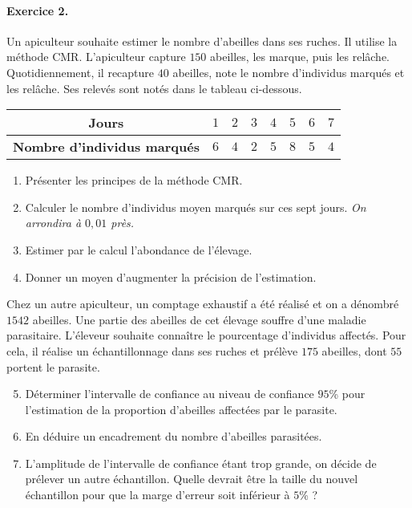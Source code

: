 \documentclass[11pt]{article}
\begin{document}
\paragraph{Exercice 2.} Un apiculteur souhaite estimer le nombre d'abeilles dans
ses ruches. Il utilise la méthode CMR. L'apiculteur capture $150$ abeilles, les
marque, puis les rel\^ache. Quotidiennement, il recapture $40$ abeilles, note le
nombre d'individus marqués et les rel\^ache. Ses relevés sont notés dans le
tableau ci-dessous.
\begin{center}
  \renewcommand{\arraystretch}{1.2}
  \begin{tabular}[]{|c|c|c|c|c|c|c|c|}
    \hline
    \textbf{Jours} & $1$ & $2$ & $3$ & $4$ & $5$ & $6$ & $7$ \\
    \hline
    \textbf{Nombre d'individus marqués} & $6$ & $4$ & $2$ & $5$ & $8$ & $5$ &
    $4$ \\
    \hline
  \end{tabular}
\end{center}
\begin{enumerate}
  \item Présenter les principes de la méthode CMR.
  \item Calculer le nombre d'individus moyen marqués sur ces sept jours.
    \emph{On arrondira à $0,01$ près.}
  \item Estimer par le calcul l'abondance de l'élevage.
  \item Donner un moyen d'augmenter la précision de l'estimation.
\end{enumerate}
Chez un autre apiculteur, un comptage exhaustif a été réalisé et on a dénombré
$1542$ abeilles. Une partie des abeilles de cet élevage souffre d'une maladie
parasitaire. L'éleveur souhaite connaître le pourcentage d'individus affectés.
Pour cela, il réalise un échantillonnage dans ses ruches et prélève $175$
abeilles, dont $55$ portent le parasite.
\begin{enumerate}
    \setcounter{enumi}{4}
  \item Déterminer l'intervalle de confiance au niveau de confiance $95$\% pour
    l'estimation de la proportion d'abeilles affectées par le parasite.
  \item En déduire un encadrement du nombre d'abeilles parasitées.
  \item L'amplitude de l'intervalle de confiance étant trop grande, on décide de prélever un
    autre échantillon. Quelle devrait être la taille du nouvel échantillon pour
    que la marge d'erreur soit inférieur à $5$\% ?
\end{enumerate}
\end{document}
